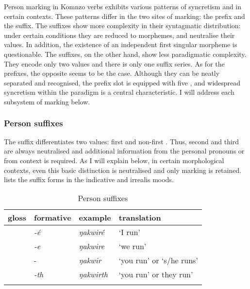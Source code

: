 Person marking in Komnzo verbs exhibits various patterns of syncretism and  in certain contexts. These patterns differ in the two sites of  marking: the prefix and the suffix. The suffixes show more complexity in their syntagmatic distribution: under certain conditions they are reduced to  morphemes, and neutralise their  values. In addition, the existence of an independent first singular morpheme is questionable. The suffixes, on the other hand, show less paradigmatic complexity. They encode only two  values and there is only one suffix series. As for the prefixes, the opposite seems to be the case. Although they can be neatly separated and recognised, the prefix slot is equipped with five , and widespread syncretism within the paradigm is a central characteristic. I will address each subsystem of  marking below.

\subsubsection{Person suffixes} \label{personsuffsection}

The  suffix differentiates two  values: first and non-first . Thus, second and third  are always neutralised and additional information from the personal pronouns or from context is required. As I will explain below, in certain morphological contexts, even this basic distinction is neutralised and only  marking is retained.  lists the suffix forms in the indicative and irrealis moods.

\begin{table}
\caption{Person suffixes}
\label{perssuff}
	\begin{tabularx}{\textwidth}{XXXl}
		\lsptoprule
		{gloss} & {formative} & {example} &{translation}\\\midrule
		\Fsg &\emph{-é} &\emph{ŋakwiré}	&`I run'\\
		\Fnsg &\emph{-e} &\emph{ŋakwire} &`we run'\\
		\Stsg &-\Zero &\emph{ŋakwir} &`you run' or `s/he runs'\\
		\Stnsg &\emph{-th} &\emph{ŋakwirth}	&`you run' or they run'\\
		\lspbottomrule
	\end{tabularx}
\end{table}%

